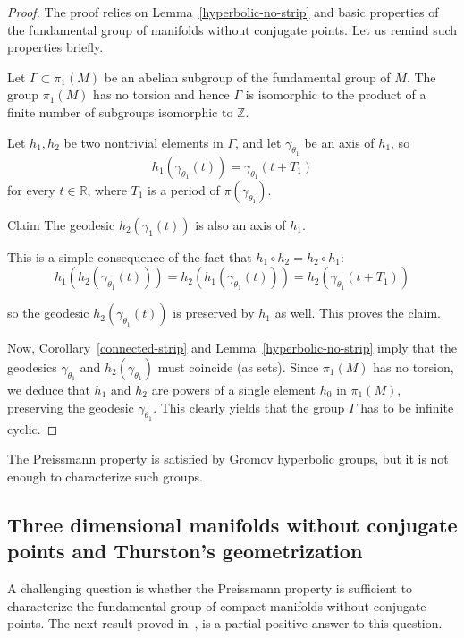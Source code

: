 \documentclass[AHL,Unicode,longabstracts,published]{cedram}
\newcommand{\bbR}{\mathbb{R}}
\newcommand{\bbZ}{\mathbb{Z}}
\begin{document}
\begin{proof}
The proof relies on Lemma~\ref{hyperbolic-no-strip} and basic properties of the fundamental group of manifolds without conjugate points. Let us remind such properties briefly.

Let $\Gamma \subset \pi_{1}(M)$ be an abelian subgroup of the fundamental group of $M$. The group $\pi_{1}(M)$ has no torsion and hence $\Gamma$ is isomorphic to the product of a finite number of subgroups isomorphic to $\bbZ$.

Let $h_{1}, h_{2}$ be two nontrivial elements in $\Gamma$, and let $\gamma_{\theta_{1}}$ be an axis of $h_{1}$, so
\[
h_{1}(\gamma_{\theta_1}(t)) = \gamma_{\theta_1}(t + T_{1})
\]
for every $t \in \bbR$, where $T_{1}$ is a period of $\pi(\gamma_{\theta_{1}})$.

\begin{enonce*}[plain]{Claim}
The geodesic $h_{2}(\gamma_{1}(t))$ is also an axis of $h_{1}$.
\end{enonce*}

This is a simple consequence of the fact that $h_{1}\circ h_{2} = h_{2} \circ h_{1}$:
\[
h_{1}(h_{2}(\gamma_{\theta_{1}}(t))) = h_{2}(h_{1}(\gamma_{\theta_{1}}(t))) = h_{2}(\gamma_{\theta_{1}}(t+ T_{1}))
\]

so the geodesic $h_{2}(\gamma_{\theta_{1}}(t))$ is preserved by $h_{1}$ as well. This proves the claim.

Now, Corollary~\ref{connected-strip} and Lemma~\ref{hyperbolic-no-strip} imply that the geodesics $\gamma_{\theta_{1}}$ and $h_{2}(\gamma_{\theta_{1}}) $ must coincide (as sets). Since $\pi_{1}(M)$ has no torsion, we deduce that $h_{1}$ and $h_{2}$ are powers of a single element $h_{0}$ in $\pi_{1}(M)$, preserving the geodesic $\gamma_{\theta_{1}}$. This clearly yields that the group $\Gamma$ has to be infinite cyclic.
\end{proof}

The Preissmann property is satisfied by Gromov hyperbolic groups, but it is not enough to characterize such groups.

\subsection{Three dimensional manifolds without conjugate points and Thurston's geometrization}

A challenging question is whether the Preissmann property is sufficient to characterize the fundamental group of compact manifolds without conjugate points. The next result proved in~\cite[Chapter~8]{kn:Ruggiero-Ensaios}, is a partial positive answer to this question.
\end{document}
